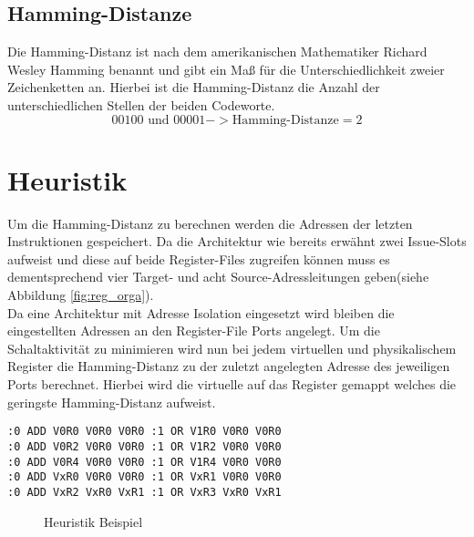 \subsection{Hamming-Distanze}
Die Hamming-Distanz ist nach dem amerikanischen Mathematiker Richard Wesley Hamming benannt und gibt ein Maß für die Unterschiedlichkeit zweier Zeichenketten an. Hierbei ist die Hamming-Distanz die Anzahl der unterschiedlichen Stellen der beiden Codeworte.
\begin{equation}
00100 \text{ und } 00001 -> \text{Hamming-Distanze}= 2
\label{eq:hammingdistanze}
\end{equation}
 
\section{Heuristik}
\label{sec:Heuristik}

Um die Hamming-Distanz zu berechnen werden die Adressen der letzten Instruktionen gespeichert. Da die Architektur  wie bereits erwähnt zwei Issue-Slots aufweist und diese auf beide Register-Files zugreifen können muss es dementsprechend vier Target- und acht Source-Adressleitungen geben(siehe Abbildung \ref{fig:reg_orga}).\\
Da eine Architektur mit Adresse Isolation eingesetzt wird bleiben die eingestellten Adressen an den Register-File Ports angelegt. Um die Schaltaktivität zu minimieren wird nun bei jedem virtuellen und physikalischem Register die Hamming-Distanz zu der zuletzt angelegten Adresse des jeweiligen Ports berechnet. Hierbei wird die virtuelle auf das Register gemappt welches die geringste Hamming-Distanz aufweist.\\
\begin{lstlisting}[frame=single, caption={Heuristik Beispiel},captionpos=b,label=code:heuristik]
:0 ADD V0R0 V0R0 V0R0 :1 OR V1R0 V0R0 V0R0
:0 ADD V0R2 V0R0 V0R0 :1 OR V1R2 V0R0 V0R0
:0 ADD V0R4 V0R0 V0R0 :1 OR V1R4 V0R0 V0R0
:0 ADD VxR0 V0R0 V0R0 :1 OR VxR1 V0R0 V0R0
:0 ADD VxR2 VxR0 VxR1 :1 OR VxR3 VxR0 VxR1
\end{lstlisting}

\begin{figure}[htbp] 
	\centering
	
	\caption{Heuristik Beispiel}
	\label{fig:heuristik}
\end{figure}

